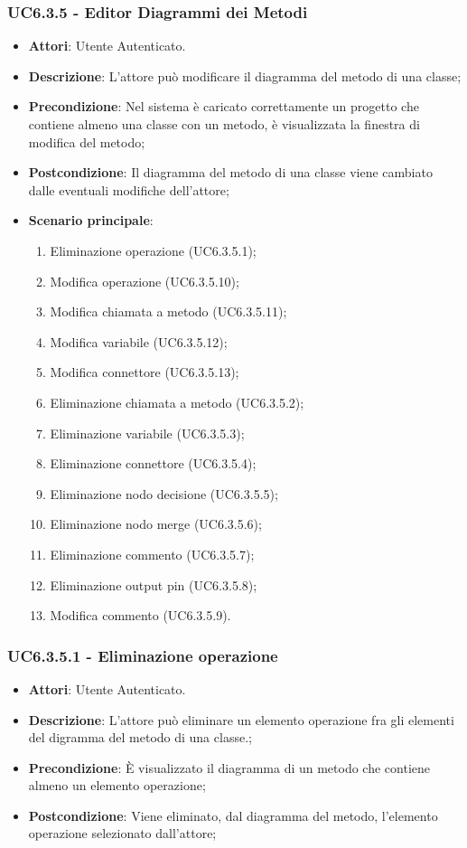 \subsubsection{UC6.3.5 - Editor Diagrammi dei Metodi} 
\label{sssec:UC6.3.5} 
\begin{itemize} 
\item \textbf{Attori}: Utente Autenticato.
\item \textbf{Descrizione}: L'attore può modificare il diagramma del metodo di una classe;
\item \textbf{Precondizione}: Nel sistema è caricato correttamente un progetto che  contiene almeno una classe con un metodo, è visualizzata la finestra di modifica del metodo;
\item \textbf{Postcondizione}: Il diagramma del metodo di una classe viene cambiato dalle eventuali modifiche dell'attore;
\item \textbf{Scenario principale}: \begin{enumerate}\item Eliminazione operazione (UC6.3.5.1);\item Modifica operazione (UC6.3.5.10);\item Modifica chiamata a metodo (UC6.3.5.11);\item Modifica variabile (UC6.3.5.12);\item Modifica connettore (UC6.3.5.13);\item Eliminazione chiamata a metodo (UC6.3.5.2);\item Eliminazione variabile (UC6.3.5.3);\item Eliminazione connettore (UC6.3.5.4);\item Eliminazione nodo decisione (UC6.3.5.5);\item Eliminazione nodo merge (UC6.3.5.6);\item Eliminazione commento (UC6.3.5.7);\item Eliminazione output pin (UC6.3.5.8);\item Modifica commento (UC6.3.5.9). 
 \end{enumerate}
\end{itemize} 
\subsubsection{UC6.3.5.1 - Eliminazione operazione} 
\label{sssec:UC6.3.5.1} 
\begin{itemize} 
\item \textbf{Attori}: Utente Autenticato.
\item \textbf{Descrizione}: L'attore può eliminare un elemento operazione fra gli elementi del digramma del metodo di una classe.;
\item \textbf{Precondizione}: È visualizzato il diagramma di un metodo che contiene almeno un elemento operazione;
\item \textbf{Postcondizione}: Viene eliminato, dal diagramma del metodo,  l'elemento operazione selezionato dall'attore;
\end{itemize} 
